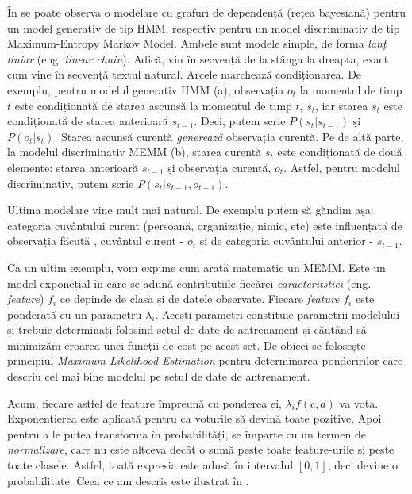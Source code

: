 
În  se poate observa o modelare cu grafuri de dependență (rețea bayesiană) pentru un model generativ de tip HMM, respectiv pentru un model discriminativ de tip Maximum-Entropy Markov Model. Ambele sunt modele simple, de forma \textit{lanț liniar} (eng. \textit{linear chain}). Adică, vin în secvență de la stânga la dreapta, exact cum vine în secvență textul natural. Arcele marchează condiționarea. De exemplu, pentru modelul generativ HMM (a), observația $o_t$ la momentul de timp $t$ este condiționată de starea ascunsă la momentul de timp $t$, $s_t$, iar starea $s_t$ este condiționată de starea anterioară $s_{t-1}$. Deci, putem scrie $P(s_t|s_{t-1})$ și $P(o_t|s_t)$. Starea ascunsă curentă \textit{generează} observația curentă. Pe de altă parte, la modelul discriminativ MEMM (b), starea curentă $s_t$ este condiționată de două elemente: starea anterioară $s_{t - 1}$ și observația curentă,  $o_t$. Astfel, pentru modelul discriminativ, putem scrie $P(s_t|s_{t - 1}, o_{t - 1})$.

Ultima modelare vine mult mai natural. De exemplu putem să găndim așa: categoria cuvântului curent (persoană, organizație, nimic, etc) este influențată de observația făcută , cuvântul curent - $o_t$ și de categoria cuvântului anterior - $s_{t-1}$.


Ca un ultim exemplu, vom expune cum arată matematic un MEMM. Este un model exponețial în care se adună contribuțiile fiecărei \textit{caracteritstici} (eng. \textit{feature}) $f_i$ ce depinde de clasă și de datele observate. Fiecare \textit{feature} $f_i$ este ponderată cu un parametru $\lambda_{i}$. Acești parametri constituie parametrii modelului și trebuie determinați folosind setul de date de antrenament și căutând să minimizăm eroarea unei funcții de cost pe acest set. De obicei se folosește principiul \textit{Maximum Likelihood Estimation} pentru determinarea ponderirilor care descriu cel mai bine modelul pe setul de date de antrenament.

Acum, fiecare astfel de feature împreună cu ponderea ei, $\lambda_{i} f(c,d) $ va vota. Exponențierea este aplicată pentru ca voturile să devină toate pozitive. Apoi, pentru a le putea transforma în probabilități, se împarte cu un termen de \textit{normalizare}, care nu este altceva decât o sumă peste toate feature-urile și peste toate clasele. Astfel, toată expresia este adusă în intervalul $[0,1]$, deci devine o probabilitate. Ceea ce am descris este ilustrat în .


